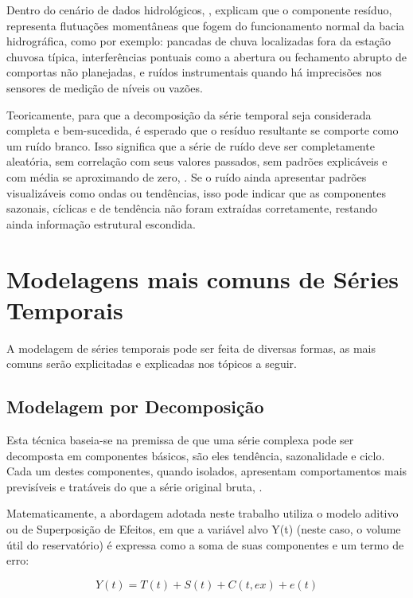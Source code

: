Dentro do cenário de dados hidrológicos, \textcite{Morettin_Toloi}, explicam que o componente resíduo, representa flutuações momentâneas que fogem do funcionamento normal da bacia hidrográfica, como por exemplo: pancadas de chuva localizadas fora da estação chuvosa típica, interferências pontuais como a abertura ou fechamento abrupto de comportas não planejadas, e ruídos instrumentais quando há imprecisões nos sensores de medição de níveis ou vazões.  

Teoricamente, para que a decomposição da série temporal seja considerada completa e bem-sucedida, é esperado que o resíduo resultante se comporte como um ruído branco. Isso significa que a série de ruído deve ser completamente aleatória, sem correlação com seus valores passados, sem padrões explicáveis e com média se aproximando de zero, \cite{Hyndman_Athanassopoulos}. Se o ruído ainda apresentar padrões visualizáveis como ondas ou tendências, isso pode indicar que as componentes sazonais, cíclicas e de tendência não foram extraídas corretamente, restando ainda informação estrutural escondida. 

\section{Modelagens mais comuns de Séries Temporais}

A modelagem de séries temporais pode ser feita de diversas formas, as mais comuns serão explicitadas e explicadas nos tópicos a seguir. 

\subsection{Modelagem por Decomposição}

Esta técnica baseia-se na premissa de que uma série complexa pode ser decomposta em componentes básicos, são eles tendência, sazonalidade e ciclo. Cada um destes componentes, quando isolados, apresentam comportamentos mais previsíveis e tratáveis do que a série original bruta, \cite{Morettin_Toloi}. 

Matematicamente, a abordagem adotada neste trabalho utiliza o modelo aditivo ou de Superposição de Efeitos, em que a variável alvo Y(t) (neste caso, o volume útil do reservatório) é expressa como a soma de suas componentes e um termo de erro: 

\begin{equation}
Y(t) = T(t) + S(t) + C(t, ex) + e(t)
\end{equation}

